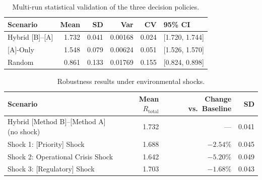 \documentclass[10pt,twocolumn]{article}
\newcommand{\tabfont}{\fontsize{8.5}{10.5}\selectfont}
\begin{document}
\begin{table}[H]
\caption{Multi-run statistical validation of the three decision policies.}
\label{tab:multirun}
\tabfont
\setlength{\tabcolsep}{3pt}
\begin{tabular}{lrrrrp{1.8cm}}
\toprule
\textbf{Scenario} & \textbf{Mean} & \textbf{SD} & \textbf{Var} & \textbf{CV} & \textbf{95\% CI} \\
\midrule
Hybrid [B]--[A]  & 1.732 & 0.041 & 0.00168 & 0.024 & {[1.720, 1.744]} \\
{[A]-Only}       & 1.548 & 0.079 & 0.00624 & 0.051 & {[1.526, 1.570]} \\
Random           & 0.861 & 0.133 & 0.01769 & 0.155 & {[0.824, 0.898]} \\
\bottomrule
\end{tabular}
\end{table}

\begin{table}[H]
\caption{Robustness results under environmental shocks.}
\label{tab:shocks}
\tabfont
\setlength{\tabcolsep}{6pt}
\begin{tabularx}{\columnwidth}{Xrrr}
\toprule
\textbf{Scenario} & \textbf{Mean $R_{\mathrm{total}}$}
 & \textbf{Change vs.\ Baseline} & \textbf{SD} \\
\midrule
Hybrid [Method B]--[Method A] (no shock) & 1.732 & ---      & 0.041 \\
Shock 1: [Priority] Shock                & 1.688 & $-2.54\%$ & 0.045 \\
Shock 2: Operational Crisis Shock        & 1.642 & $-5.20\%$ & 0.049 \\
Shock 3: [Regulatory] Shock             & 1.703 & $-1.68\%$ & 0.043 \\
\bottomrule
\end{tabularx}
\end{table}

\end{document}
